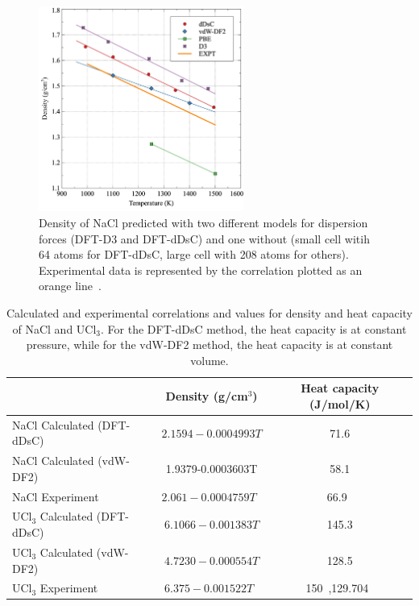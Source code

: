 \documentclass[preprint,3p,10pt,onecolumn,number,sort&compress]{elsarticle}
\begin{document}
{\begin{figure}[htb]
\centering
\includegraphics[width=0.6\textwidth]{fig3a.jpg}
\caption{Density of NaCl predicted with two different models for dispersion forces (DFT-D3 and DFT-dDsC) and one without (small cell witih 64 atoms for DFT-dDsC, large cell with 208 atoms for others). Experimental data is represented by the correlation plotted as an orange line~\cite{Janz1988}.} %
\label{fig:NaCldensity}
\end{figure}

\begin{table}[hb!]
\centering
\begin{tabular}{lcc}
\hline
\hline
& Density (g/cm$^3$) &Heat capacity (J/mol/K) \\
\hline
NaCl Calculated (DFT-dDsC)	&$2.1594-0.0004993T$ &71.6 \\
NaCl Calculated (vdW-DF2)	& 1.9379-0.0003603T & 58.1 \\
NaCl Experiment	&$2.061-0.0004759T$~\cite{Janz1988} &66.9~\cite{NIST}  \\	
UCl$_3$ Calculated (DFT-dDsC) &$6.1066-0.001383T$ &145.3 \\	
UCl$_3$ Calculated (vdW-DF2) &$4.7230-0.000554T$ & 128.5 \\	
UCl$_3$ Experiment	&$6.375-0.001522T$~\cite{Desyatnik} &150~\cite{BENES2008},129.704~\cite{YIN2020} \\
\hline
\hline
\end{tabular}
\caption{Calculated and experimental correlations and values for density and heat capacity of NaCl and UCl$_3$. For the DFT-dDsC method, the heat capacity is at constant pressure, while for the vdW-DF2 method, the heat capacity is at constant volume.}%
\label{table:NaCldensityetc}
\end{table}

}
\end{document}
